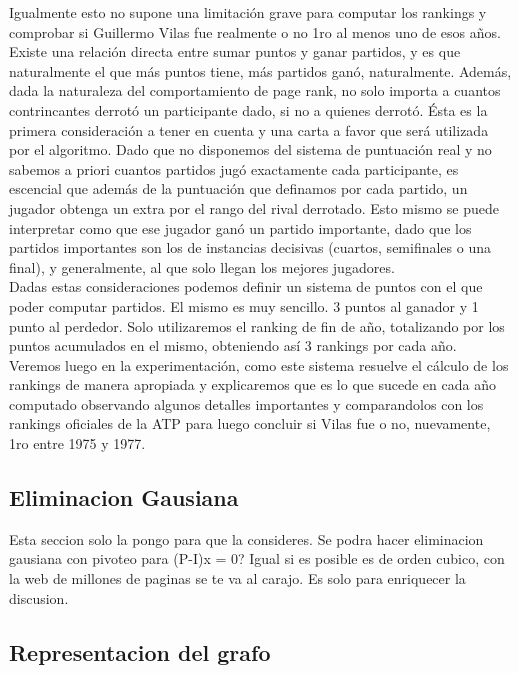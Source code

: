 Igualmente esto no supone una limitación grave para computar los rankings y comprobar si Guillermo Vilas fue realmente o no 1ro al menos uno de esos años.
\\
Existe una relación directa entre sumar puntos y ganar partidos, y es que naturalmente el que más puntos tiene, más partidos ganó, naturalmente.
Además, dada la naturaleza del comportamiento de page rank, no solo importa a cuantos contrincantes derrotó un participante dado, si no a quienes derrotó. Ésta es la primera consideración a tener en cuenta y una carta a favor que será utilizada por el algoritmo. Dado que no disponemos del sistema de puntuación real y no sabemos a priori cuantos partidos jugó exactamente cada participante, es escencial que además de la puntuación que definamos por cada partido, un jugador obtenga un extra por el rango del rival derrotado. Esto mismo se puede interpretar como que ese jugador ganó un partido importante, dado que los partidos importantes son los de instancias decisivas (cuartos, semifinales o una final), y generalmente, al que solo llegan los mejores jugadores.    
\\
Dadas estas consideraciones podemos definir un sistema de puntos con el que poder computar partidos. El mismo es muy sencillo. 3 puntos al ganador y 1 punto al perdedor. Solo utilizaremos el ranking de fin de año, totalizando por los puntos acumulados en el mismo, obteniendo así 3 rankings por cada año.
\\
Veremos luego en la experimentación, como este sistema resuelve el cálculo de los rankings de manera apropiada y explicaremos que es lo que sucede en cada año computado observando algunos detalles importantes y comparandolos con los rankings oficiales de la ATP para luego concluir si Vilas fue o no, nuevamente, 1ro entre 1975 y 1977.

\subsection{Eliminacion Gausiana}

Esta seccion solo la pongo para que la consideres. Se podra hacer eliminacion gausiana con pivoteo para (P-I)x = 0? Igual si es posible es de orden cubico, con la web de millones de paginas se te va al carajo. Es solo para enriquecer la discusion.

\subsection{Representacion del grafo}

